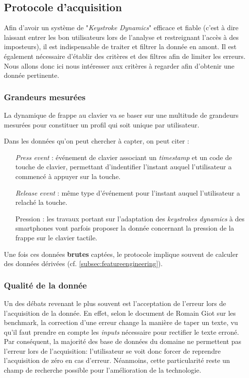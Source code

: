 \subsection{Protocole d'acquisition}

Afin d'avoir un système de "\textit{Keystroke Dynamics}" efficace et fiable (c'est à dire laissant entrer les bon utilisateurs lors de l'analyse et restreignant l'accès à des imposteurs), il est indispensable de traiter et filtrer la donnée en amont. Il est également nécessaire d'établir des critères et des filtres afin de limiter les erreurs. Nous allons donc ici nous intéresser aux critères à regarder afin d'obtenir une donnée pertinente.

\subsubsection{Grandeurs mesurées}
La dynamique de frappe au clavier va se baser sur une multitude de grandeurs mesurées pour constituer un profil qui soit unique par utilisateur\cite{giotThese,Hu2008,gunetti2005,bergadano2002}.

Dans les données qu'on peut chercher à capter, on peut citer :

\begin{itemize}
	\item[\textit{Press event}] : événement de clavier associant un \textit{timestamp} et un code de touche de clavier, permettant d'indentifier l'instant auquel l'utilisateur a commencé à appuyer sur la touche.
	\item[\textit{Release event}] : même type d'événement pour l'instant auquel l'utilisateur a relaché la touche.
	\item[Pression] : les travaux portant sur l'adaptation des \textit{keystrokes dynamics} à des smartphones vont parfois proposer la donnée concernant la pression de la frappe sur le clavier tactile.
\end{itemize}

Une fois ces données \textbf{brutes} captées, le protocole implique souvent de calculer des données dérivées (cf. \ref{subsec:featureengineering}).

\subsubsection{Qualité de la donnée}

Un des débats revenant le plus souvent est l'acceptation de l'erreur lors de l'acquisition de la donnée. En effet, selon le document de Romain Giot sur les benchmark\cite{giotBenchmark}, la correction d'une erreur change la manière de taper un texte, vu qu'il faut  prendre en compte les \textit{inputs} nécessaire pour rectifier le texte erroné. Par conséquent, la majorité des base de données du domaine ne permettent pas l'erreur lors de l'acquisition: l'utilisateur se voit donc forcer de reprendre l'acquisition de zéro en cas d'erreur. Néanmoins, cette particularité reste un champ de recherche possible pour l'amélioration de la technologie.\\

